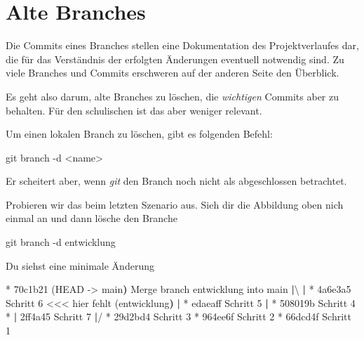 \documentclass[
  letterpaper,
  DIV=11]{scrreprt}
\newenvironment{Shaded}{\begin{snugshade}}{\end{snugshade}}
\newcommand{\AttributeTok}[1]{\textcolor[rgb]{0.40,0.45,0.13}{#1}}
\newcommand{\ErrorTok}[1]{\textcolor[rgb]{0.68,0.00,0.00}{#1}}
\newcommand{\ExtensionTok}[1]{\textcolor[rgb]{0.00,0.23,0.31}{#1}}
\newcommand{\FunctionTok}[1]{\textcolor[rgb]{0.28,0.35,0.67}{#1}}
\newcommand{\KeywordTok}[1]{\textcolor[rgb]{0.00,0.23,0.31}{\textbf{#1}}}
\newcommand{\NormalTok}[1]{\textcolor[rgb]{0.00,0.23,0.31}{#1}}
\newcommand{\OperatorTok}[1]{\textcolor[rgb]{0.37,0.37,0.37}{#1}}
\newcommand{\StringTok}[1]{\textcolor[rgb]{0.13,0.47,0.30}{#1}}
\newcommand{\git}{\textit{git}\xspace}
\begin{document}
\section{Alte Branches}\label{alte-branches}

Die Commits eines Branches stellen eine Dokumentation des
Projektverlaufes dar, die für das Verständnis der erfolgten Änderungen
eventuell notwendig sind. Zu viele Branches und Commits erschweren auf
der anderen Seite den Überblick.

Es geht also darum, alte Branches zu löschen, die \emph{wichtigen}
Commits aber zu behalten. Für den schulischen ist das aber weniger
relevant.

Um einen lokalen Branch zu löschen, gibt es folgenden Befehl:

\begin{Shaded}
\begin{Highlighting}[]
\FunctionTok{git}\NormalTok{ branch }\AttributeTok{{-}d} \OperatorTok{\textless{}}\NormalTok{name}\OperatorTok{\textgreater{}}
\end{Highlighting}
\end{Shaded}

Er scheitert aber, wenn \git den Branch noch nicht als abgeschlossen
betrachtet.

Probieren wir das beim letzten Szenario aus. Sieh dir die Abbildung oben
nich einmal an und dann lösche den Branche

\begin{Shaded}
\begin{Highlighting}[]
\FunctionTok{git}\NormalTok{ branch }\AttributeTok{{-}d}\NormalTok{ entwicklung }
\end{Highlighting}
\end{Shaded}

Du siehst eine minimale Änderung

\begin{Shaded}
\begin{Highlighting}[]
\ExtensionTok{*}\NormalTok{   70c1b21 }\ErrorTok{(}\ExtensionTok{HEAD} \AttributeTok{{-}}\OperatorTok{\textgreater{}}\NormalTok{ main}\KeywordTok{)} \ExtensionTok{Merge}\NormalTok{ branch }\StringTok{\textquotesingle{}entwicklung\textquotesingle{}}\NormalTok{ into main}
\KeywordTok{|}\ExtensionTok{\textbackslash{} } 
\KeywordTok{|} \ExtensionTok{*}\NormalTok{ 4a6e3a5 Schritt 6   }\OperatorTok{\textless{}\textless{}\textless{}}\NormalTok{ hier fehlt }\ErrorTok{(}\ExtensionTok{entwicklung}\KeywordTok{)}
\KeywordTok{|} \ExtensionTok{*}\NormalTok{ edaeaff Schritt 5}
\KeywordTok{|} \ExtensionTok{*}\NormalTok{ 508019b Schritt 4}
\ExtensionTok{*} \KeywordTok{|} \ExtensionTok{2ff4a45}\NormalTok{ Schritt 7}
\KeywordTok{|}\ExtensionTok{/}  
\ExtensionTok{*}\NormalTok{ 29d2bd4 Schritt 3}
\ExtensionTok{*}\NormalTok{ 964ee6f Schritt 2}
\ExtensionTok{*}\NormalTok{ 66dcd4f Schritt 1}
\end{Highlighting}
\end{Shaded}
\end{document}
